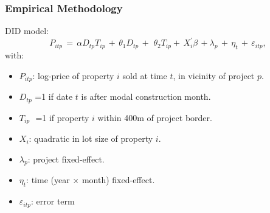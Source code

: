 \documentclass[aspectratio=149]{beamer}
\begin{document}




\begin{frame}
\frametitle{Empirical Methodology}
DID model:
\begin{equation*}
P_{itp} \, = \, \alpha D_{tp}T_{ip} \, + \,\theta_1 D_{tp} \, + \, \,\theta_2 T_{ip}+ \, X^{'}_{i}\beta \, +  \lambda_p \,  + \, \eta_{t} \, + \, \varepsilon_{itp} ,
\end{equation*}
with:
\begin{itemize}
\item $P_{itp}$: log-price of property $i$ sold at time $t$, in vicinity of project $p$.
\item $D_{tp}$ =1 if date $t$ is after modal construction month. 
\item $T_{ip}\,\,$ =1 if property $i$ within 400m of project border.
\item $X_{i}$: quadratic in lot size of property $i$.
\item $\lambda_p$: project fixed-effect.
\item $\eta_{t}$: time (year$\,\times\,$month) fixed-effect.

\item $\varepsilon_{itp}$: error term
\end{itemize}
\end{frame}

\end{document}

